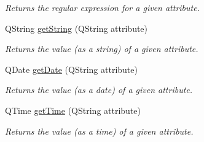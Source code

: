 \begin{DoxyCompactItemize}
\begin{DoxyCompactList}\small\item\em Returns the regular expression for a given attribute. \item\end{DoxyCompactList}\item 
\hypertarget{classProfile_a1f7965e9e5481d64b833a4d1effb06fd}{
QString \hyperlink{classProfile_a1f7965e9e5481d64b833a4d1effb06fd}{getString} (QString attribute)}
\label{classProfile_a1f7965e9e5481d64b833a4d1effb06fd}

\begin{DoxyCompactList}\small\item\em Returns the value (as a string) of a given attribute. \item\end{DoxyCompactList}\item 
\hypertarget{classProfile_a2e0a95101046e8e5224e17baa1776400}{
QDate \hyperlink{classProfile_a2e0a95101046e8e5224e17baa1776400}{getDate} (QString attribute)}
\label{classProfile_a2e0a95101046e8e5224e17baa1776400}

\begin{DoxyCompactList}\small\item\em Returns the value (as a date) of a given attribute. \item\end{DoxyCompactList}\item 
\hypertarget{classProfile_a2a72dd6fcb43906c912fa5416479db1c}{
QTime \hyperlink{classProfile_a2a72dd6fcb43906c912fa5416479db1c}{getTime} (QString attribute)}
\label{classProfile_a2a72dd6fcb43906c912fa5416479db1c}

\begin{DoxyCompactList}\small\item\em Returns the value (as a time) of a given attribute. \item\end{DoxyCompactList}\end{DoxyCompactItemize}
